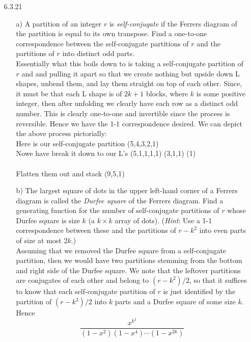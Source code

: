 \documentclass[12pt]{article}
\begin{document}
\begin{enumerate}
\item[6.3.21] 
\begin{enumerate}
\item[a)] A partition of an integer $r$ is \emph{self-conjugate} if the Ferrers diagram of the partition is equal to its own transpose. Find a one-to-one correspondence between the self-conjugate partitions of $r$ and the partitions of $r$ into distinct odd parts. \\
Essentially what this boils down to is taking a self-conjugate partition of $r$ and 
and pulling it apart so that we create nothing but upside down L shapes, unbend them, and lay
them straight on top of each other. Since, it must be that each L shape is of $2k + 1$ blocks,
where $k$ is some positive integer, then after unfolding we clearly have each row as a
distinct odd number. This is clearly one-to-one and invertible since the process is reversible.
Hence we have the 1-1 correspondence desired. We can depict the above process pictorially: \\
Here is our self-conjugate partition \yng(5,4,3,2,1) \\
Nowe have break it down to our L's \yng(5,1,1,1,1) \yng(3,1,1) \yng(1) \\
\\
Flatten them out and stack \yng(9,5,1)
\item[b)] The largest square of dots in the upper left-hand corner of a Ferrers diagram is called the \emph{Durfee square} of the Ferrers diagram. Find a generating function for the number of self-conjugate partitions of $r$ whose Durfee square is size $k$ (a $k \times k$ array of dots). (\emph{Hint}: Use a 1-1 correspondence between these and the partitions of $r - k^2$ into even parts of size at most $2k$.) \\
Assuming that we removed the Durfee square from a self-conjugate partition, then we would
have two partitions stemming from the bottom and right side of the Durfee square. We note that
the leftover partitions are conjugates of each other and belong to $(r - k^2)/2$, so that it suffices
to know that each self-conjugate partition of $r$ is just identified by the partition of $(r - k^2)/2$
into $k$ parts and a Durfee square of some size $k$. Hence
\[
\frac{x^{k^2}}{(1 - x^2)(1 - x^4)\cdots (1 - x^{2k})}
\]
\end{enumerate}


\end{enumerate}
\end{document}
